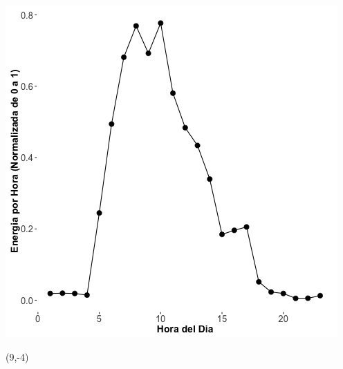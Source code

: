\documentclass{article}\usepackage[]{graphicx}\usepackage[]{color}
\newenvironment{knitrout}{}{} %
\begin{document}
\begin{knitrout}
\color{fgcolor}
\includegraphics[scale=0.75]{figure/A29_fplot_norm_median} 
\end{knitrout}

 \begin{textblock}{1}(9,-4)
\begin{minipage}{20em}
\begingroup

\endgroup
\end{minipage}
\end{textblock}
\end{document}
